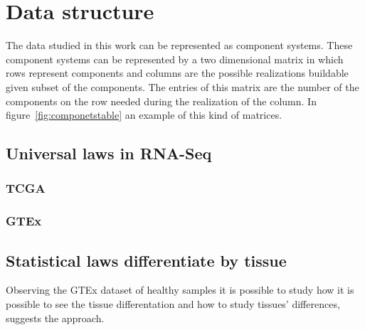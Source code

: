 \chapter{Data structure}\label{ch:structure}

The data studied in this work can be represented as component systems. These component systems can be represented by a two dimensional matrix in which rows represent components and columns are the possible realizations buildable given subset of the components. The entries of this matrix are the number of the components on the row needed during the realization of the column. In figure~\ref{fig:componetstable} an example of this kind of matrices.



\section{Universal laws in RNA-Seq}
\subsection{TCGA}

\subsection{GTEx}




\section{Statistical laws differentiate by tissue}
Observing the GTEx dataset of healthy samples it is possible to study how it is possible to see the tissue differentation and how to study tissues' differences,~\cite{mele2014} suggests the approach.

